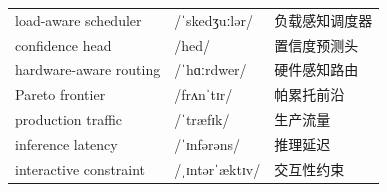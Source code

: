 \documentclass[UTF8,12pt,a4paper]{ctexart}
\providecommand{\zh}[1]{#1}
\begin{document}
\begin{tabular*}{\textwidth}{@{\extracolsep{\fill}}lll@{}}
load-aware scheduler & {\ipafont /ˈskedʒuːlər/} & \zh{负载感知调度器} \\
confidence head & {\ipafont /hed/} & \zh{置信度预测头} \\
hardware-aware routing & {\ipafont /ˈhɑːrdwer/} & \zh{硬件感知路由} \\
Pareto frontier & {\ipafont /frʌnˈtɪr/} & \zh{帕累托前沿} \\
production traffic & {\ipafont /ˈtræfɪk/} & \zh{生产流量} \\
inference latency & {\ipafont /ˈɪnfərəns/} & \zh{推理延迟} \\
interactive constraint & {\ipafont /ˌɪntərˈæktɪv/} & \zh{交互性约束} \\
\bottomrule
\end{tabular*}
\end{document}
